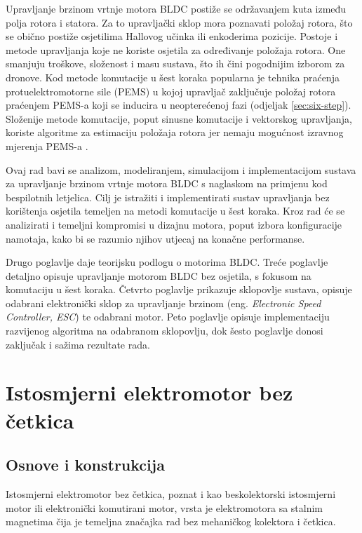\documentclass[diplomskirad]{fer}
\begin{document}
Upravljanje brzinom vrtnje motora BLDC postiže se održavanjem kuta između polja
rotora i statora. Za to upravljački sklop mora poznavati položaj rotora, što se
obično postiže osjetilima Hallovog učinka ili enkoderima pozicije. Postoje i
metode upravljanja koje ne koriste osjetila za određivanje položaja rotora. One
smanjuju troškove, složenost i masu sustava, što ih čini pogodnijim izborom za
dronove. Kod metode komutacije u šest koraka popularna je tehnika praćenja
protuelektromotorne sile (PEMS) u kojoj upravljač zaključuje položaj rotora
praćenjem PEMS-a koji se inducira u neopterećenoj fazi (odjeljak
\ref{sec:six-step}). Složenije metode komutacije, poput sinusne komutacije i
vektorskog upravljanja, koriste algoritme za estimaciju položaja rotora jer
nemaju mogućnost izravnog mjerenja PEMS-a \cite{NXP_AN2355}.

Ovaj rad bavi se analizom, modeliranjem, simulacijom i implementacijom sustava
za upravljanje brzinom vrtnje motora BLDC s naglaskom na primjenu kod
bespilotnih letjelica. Cilj je istražiti i implementirati sustav upravljanja
bez korištenja osjetila temeljen na metodi komutacije u šest koraka. Kroz
rad će se analizirati i temeljni kompromisi u dizajnu motora, poput izbora
konfiguracije namotaja, kako bi se razumio njihov utjecaj na konačne
performanse.

Drugo poglavlje daje teorijsku podlogu o motorima BLDC. Treće poglavlje
detaljno opisuje upravljanje motorom BLDC bez osjetila, s fokusom na komutaciju
u šest koraka. Četvrto poglavlje prikazuje sklopovlje sustava, opisuje odabrani
elektronički sklop za upravljanje brzinom (eng. \textit{Electronic Speed
	Controller, ESC}) te odabrani motor. Peto poglavlje opisuje implementaciju
razvijenog algoritma na odabranom sklopovlju, dok šesto poglavlje donosi zaključak i sažima rezultate rada.
\chapter{Istosmjerni elektromotor bez četkica}
\label{pog:bldc}
\section{Osnove i konstrukcija}
\label{sec:bldc:uvod}

Istosmjerni elektromotor bez četkica, poznat i kao beskolektorski istosmjerni
motor ili elektronički komutirani motor, vrsta je elektromotora sa stalnim
magnetima čija je temeljna značajka rad bez mehaničkog kolektora i četkica.
\end{document}
